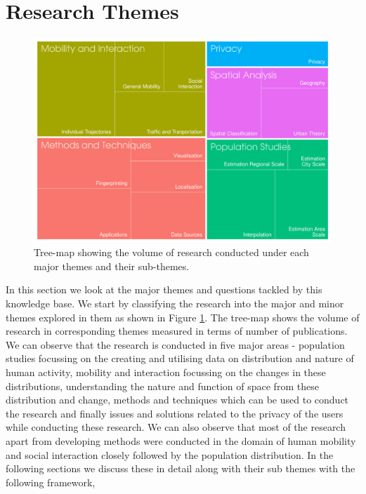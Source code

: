 
\section{Research Themes}

\begin{figure}
  \includegraphics{images/literature-themes-treemap.png}
  \caption{Tree-map showing the volume of research conducted under each major themes and their sub-themes.}
  \label{figure:literature:themes}
\end{figure}

In this section we look at the major themes and questions tackled by this knowledge base.
We start by classifying the research into the major and minor themes explored in them as shown in Figure \ref{figure:literature:themes}.
The tree-map shows the volume of research in corresponding themes measured in terms of number of publications.
We can observe that the research is conducted in five major areas - population studies focussing on the creating and utilising data on distribution and nature of human activity, mobility and interaction focussing on the changes in these distributions, understanding the nature and function of space from these distribution and change, methods and techniques which can be used to conduct the research and finally issues and solutions related to the privacy of the users while conducting these research.
We can also observe that most of the research apart from developing methods were conducted in the domain of human mobility and social interaction closely followed by the population distribution.
In the following sections we discuss these in detail along with their sub themes with the following framework,

